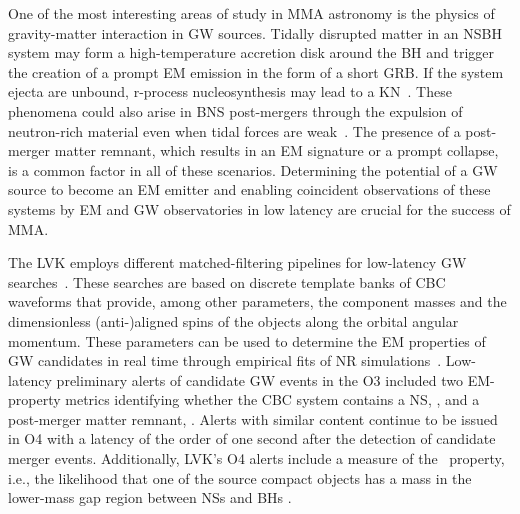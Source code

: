 One of the most interesting areas of study in \ac{MMA} astronomy is the physics of gravity-matter interaction in \ac{GW} sources. Tidally disrupted matter in an \ac{NSBH} system may form a
high-temperature accretion disk around the \ac{BH} and trigger the creation of a prompt \ac{EM} emission in the form of a short \ac{GRB}. If the system ejecta are unbound, r-process
nucleosynthesis may lead to a \ac{KN}~\cite{Lattimer:1974slx, Li:1998bw, Korobkin:2012uy, Barnes:2013wka, Tanaka:2013ana, Kasen:2014toa}. These phenomena could also arise in \ac{BNS}
post-mergers through the expulsion of neutron-rich material even when tidal forces are weak~\cite{LIGOScientific:2017ync, Arcavi:2017xiz, Coulter:2017wya, Kasliwal:2017ngb, Lipunov:2017dwd,
DES:2017kbs, Tanvir:2017pws}. The presence of a post-merger matter remnant, which results in an \ac{EM} signature or a prompt collapse, is a common factor in all of these scenarios. Determining
the potential of a \ac{GW} source to become an \ac{EM} emitter and enabling coincident observations of these systems by \ac{EM} and \ac{GW} observatories in low latency are crucial for the success
of \ac{MMA}.

The \ac{LVK} employs different matched-filtering pipelines for low-latency \ac{GW} searches~\cite{Sachdev:2020lfd,Nitz:2018rgo,Adams:2015ulm,Kovalam:2021bgg,Hooper:2011rb}. These searches are based on discrete template banks of \ac{CBC} waveforms that provide, among other parameters, the component masses and the dimensionless (anti-)aligned spins of the
objects along the orbital angular momentum. These parameters can be used to determine the \ac{EM} properties of \ac{GW} candidates in real time through empirical fits of \ac{NR}
simulations~\cite{Foucart:2012nc,Foucart:2018rjc}. Low-latency preliminary alerts of candidate \ac{GW} events in the \ac{O3} included two \ac{EM}-property metrics identifying whether the
\ac{CBC} system contains a \ac{NS}, \hasns, and a post-merger matter remnant, \hasrem. Alerts with similar content continue to be issued in \ac{O4} with a  latency of the order of
one second after the detection of candidate merger events.  Additionally, \ac{LVK}'s \ac{O4} alerts include a measure of the \hasgap\ property, i.e., the likelihood that one of the source
compact objects has a mass in the lower-mass gap region between \ac{NS}s and \ac{BH}s .


